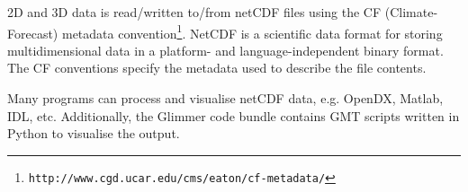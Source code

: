 2D and 3D data is read/written to/from netCDF files using the CF (Climate-Forecast) metadata convention\footnote{\texttt{http://www.cgd.ucar.edu/cms/eaton/cf-metadata/}}. NetCDF is a scientific data format for storing multidimensional data in a platform- and language-independent binary format. The CF conventions specify the metadata used to describe the file contents.

Many programs can process and visualise netCDF data, e.g. OpenDX, Matlab, IDL, etc. Additionally, the Glimmer code bundle contains GMT scripts written in Python to visualise the output.

